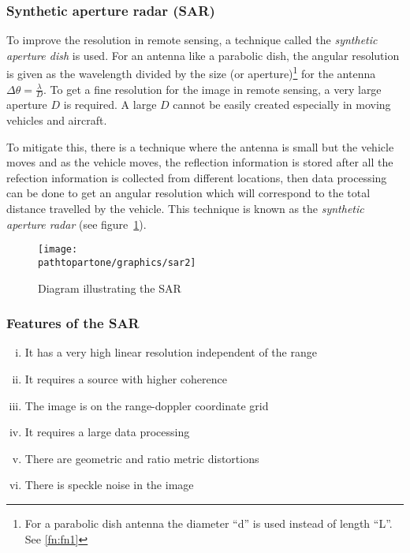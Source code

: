 \subsubsection{Synthetic aperture radar (SAR)}
To improve the resolution in remote sensing, a technique called the \textit{synthetic aperture dish} is used. For an antenna like a parabolic dish, the angular resolution is given as the wavelength divided by the size (or aperture)\footnote{For a parabolic dish antenna the diameter \textquotedblleft d\textquotedblright \hspace{0.02in} is used instead of length \textquotedblleft L\textquotedblright. See \autoref{fn:fn1}} for the antenna $\Delta \theta = \frac{\lambda}{D}$. To get a fine resolution for the image in remote sensing, a very large aperture $D$ is required. A large $D$ cannot be easily created especially in moving vehicles and aircraft.

To mitigate this, there is a technique where the antenna is small but the vehicle moves and as the vehicle moves, the reflection information is stored after all the refection information is collected from different locations, then data processing can be done to get an angular resolution which will correspond to the total distance travelled by the vehicle. This technique is known as the \textit{synthetic aperture radar} (see figure~\ref{fig:sar2}).
\begin{figure}[h]
\centering
\texttt{[image: \\pathtopartone/graphics/sar2]}
\caption{Diagram illustrating the SAR}
\label{fig:sar2}
\end{figure}

\subsubsection*{Features of the SAR}
\begin{enumerate}[(i)]
\item It has a very high linear resolution independent of the range
\item It requires a source with higher coherence
\item The image is on the range-doppler coordinate grid
\item It requires a large data processing
\item There are geometric and ratio metric distortions
\item There is speckle noise in the image
\end{enumerate}

